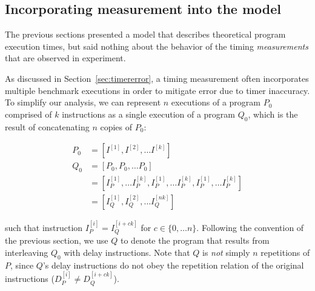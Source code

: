 \documentclass[conference]{IEEEtran}
\begin{document}
%

\subsection{Incorporating measurement into the model}

The previous sections presented a model that describes theoretical program execution times,
but said nothing about the behavior of the timing \textit{measurements} that are observed in
experiment.

As discussed in Section~\ref{sec:timererror}, a timing measurement often incorporates
multiple benchmark executions in order to mitigate error due to timer inaccuracy. To
simplify our analysis, we can represent $n$ executions of a program $P_0$ comprised of $k$
instructions as a single execution of a program $Q_0$, which is the result of concatenating
$n$ copies of $P_0$:

\begin{align}
P_0 &= \left[I^{[1]}, I^{[2]}, \dots I^{[k]} \right] \\ \nonumber
Q_0 &= \left[P_0, P_0, \dots P_0 \right] \\ \nonumber
    &= \left[I_{P}^{[1]}, \dots I_{P}^{[k]}, I_{P}^{[1]}, \dots I_{P}^{[k]}, I_{P}^{[1]}, \dots I_{P}^{[k]} \right] \\ \nonumber
    &= \left[I_{Q}^{[1]}, I_{Q}^{[2]}, \dots I_{Q}^{[nk]} \right]
\end{align}

such that instruction $I_{P}^{[i]} = I_{Q}^{[i + ck]}$ for $c \in \{0, \dots n\}$. Following
the convention of the previous section, we use $Q$ to denote the program that results from
interleaving $Q_0$ with delay instructions. Note that $Q$ is \textit{not} simply $n$
repetitions of $P$, since $Q$'s delay instructions do not obey the repetition relation
of the original instructions ($D_{P}^{[i]} \ne D_{Q}^{[i + ck]}$).
\end{document}
